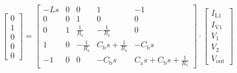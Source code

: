 \begin{equation}
\left[\begin{matrix}0\\1\\0\\0\\0\end{matrix}\right]=\left[\begin{matrix}- L s & 0 & 0 & 1 & -1\\0 & 0 & 1 & 0 & 0\\0 & 1 & \frac{1}{R_{\mathrm{s}}} & - \frac{1}{R_{\mathrm{s}}} & 0\\1 & 0 & - \frac{1}{R_{\mathrm{s}}} & C_{\mathrm{b}} s + \frac{1}{R_{\mathrm{s}}} & - C_{\mathrm{b}} s\\-1 & 0 & 0 & - C_{\mathrm{b}} s & C_{\mathrm{a}} s + C_{\mathrm{b}} s + \frac{1}{R_{\ell}}\end{matrix}\right]\cdot \left[\begin{matrix}I_{\mathrm{L1}}\\I_{\mathrm{V1}}\\V_{1}\\V_{2}\\V_{\mathrm{out}}\end{matrix}\right]
\end{equation}

